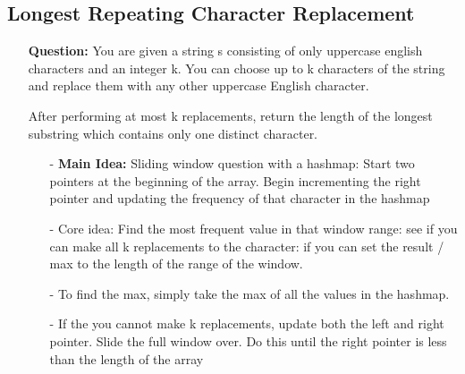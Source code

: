 \documentclass[12pt]{article}
\begin{document}
\subsection{Longest Repeating Character Replacement}
\begin{enumerate}
  \item[] \textbf{Question:} You are given a string s consisting of only uppercase english characters and an integer k. You can choose up to k characters of the string and replace them with any other uppercase English character.

After performing at most k replacements, return the length of the longest substring which contains only one distinct character.

    \begin{enumerate}
      \item[-] \textbf{Main Idea: } Sliding window question with a hashmap: Start two pointers at the beginning of the array. Begin incrementing the right pointer and updating the frequency of that character in the hashmap
      \item[-] Core idea: Find the most frequent value in that window range: see if you can make all k replacements to the character: if you can set the result / max to the length of the range of the window.
      \item[-] To find the max, simply take the max of all the values in the hashmap.  
      \item[-] If the you cannot make k replacements, update both the left and right pointer. Slide the full window over. Do this until the right pointer is less than the length of the array
    \end{enumerate}
\end{enumerate}
\end{document}
